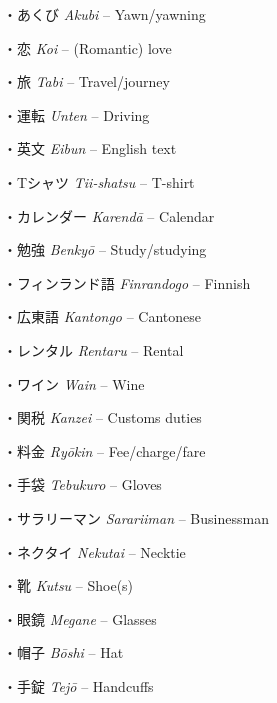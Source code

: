 \par{・あくび \emph{Akubi }– Yawn\slash yawning }
 
\par{・恋 \emph{Koi }– (Romantic) love }
 
\par{・旅 \emph{Tabi }– Travel\slash journey }
 
\par{・運転 \emph{Unten }– Driving }
 
\par{・英文 \emph{Eibun }– English text }
 
\par{・Tシャツ \emph{Tii-shatsu }– T-shirt }
 
\par{・カレンダー \emph{Karendā }– Calendar }
 
\par{・勉強 \emph{Benkyō }– Study\slash studying }
 
\par{・フィンランド語 \emph{Finrandogo }– Finnish }
 
\par{・広東語 \emph{Kantongo }– Cantonese }
 
\par{・レンタル \emph{Rentaru }– Rental }
 
\par{・ワイン \emph{Wain }– Wine }
 
\par{・関税 \emph{Kanzei }– Customs duties }
 
\par{・料金 \emph{Ryōkin }– Fee\slash charge\slash fare }
 
\par{・手袋 \emph{Tebukuro }– Gloves }
 
\par{・サラリーマン \emph{Sarariiman }– Businessman }
 
\par{・ネクタイ \emph{Nekutai }– Necktie }
 
\par{・靴 \emph{Kutsu }– Shoe(s) }
 
\par{・眼鏡 \emph{Megane }– Glasses }
 
\par{・帽子 \emph{Bōshi }– Hat }
 
\par{・手錠 \emph{Tejō }– Handcuffs }
 
